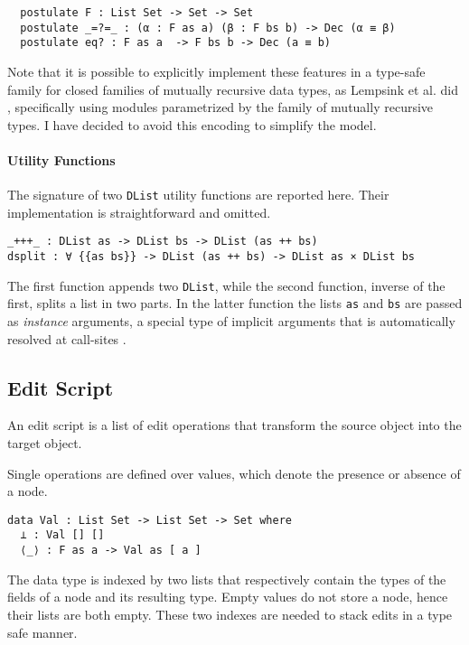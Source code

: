 \documentclass[../Thesis.tex]{subfiles}
\begin{document}
\begin{verbatim}
  postulate F : List Set -> Set -> Set 
  postulate _=?=_ : (α : F as a) (β : F bs b) -> Dec (α ≡ β)
  postulate eq? : F as a  -> F bs b -> Dec (a ≡ b)
\end{verbatim}

	Note that it is possible to explicitly implement these features in a 
	type-safe family for closed families of mutually recursive data types, 
	as Lempsink et al. did \cite{Lemp09}, specifically using modules 
	parametrized by the family of mutually recursive types. 
	I have decided to avoid this encoding to simplify the model.
		
	\paragraph{Utility Functions}
	\label{par:UtilityFun}
	The signature of two \texttt{DList} utility functions are reported here.
	Their implementation is straightforward and omitted.

\begin{verbatim}
_+++_ : DList as -> DList bs -> DList (as ++ bs)
dsplit : ∀ {{as bs}} -> DList (as ++ bs) -> DList as × DList bs
\end{verbatim}
	
	The first function appends two \texttt{DList}, while the second function,
	inverse of the first, splits a list in two parts.
	In the latter function the lists \texttt{as} and \texttt{bs} are passed
	as \emph{instance} arguments, a special type of implicit arguments 
	that is automatically resolved at call-sites \cite{Devriese11}.
		 
	\subsection{Edit Script}
	\label{subsec:EditScript}
	An edit script is a list of edit operations that transform the source object 
	into the target object.

	Single operations are defined over values, which denote the
	presence or absence of a node. 
			
\begin{verbatim}
data Val : List Set -> List Set -> Set where
  ⊥ : Val [] []
  ⟨_⟩ : F as a -> Val as [ a ] 
\end{verbatim}
	The data type is indexed by two lists that respectively contain
	 the types of the fields	of a node and its resulting type.
	 Empty values do not store a node, hence their lists are both empty.
	 These two indexes are needed to stack edits in a type safe
	 manner.
	
\end{document}
